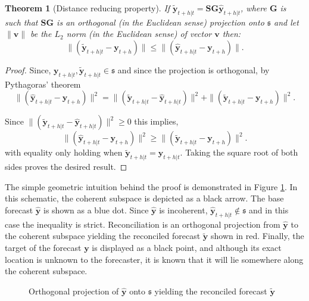 \documentclass[12pt]{article}
\newtheorem{theo}{Theorem}[section]
\theoremstyle{definition}
\theoremstyle{property}
\begin{document}
	
	\begin{theo}[Distance reducing property]\label{th:distred}
		If $\tilde{\bm{y}}_{t+h|t}=\bm{S}\bm{G}\hat{\bm{y}}_{t+h|t}$, where $\bm{G}$ is such that $\bm{S}\bm{G}$ is an orthogonal (in the Euclidean sense) projection onto $\mathfrak{s}$ and let $\|\bm{v}\|$ be the $L_2$ norm (in the Euclidean sense) of vector $\bm{v}$ then:
		\begin{equation}
		\|(\tilde{\bm{y}}_{t+h|t}-\bm{y}_{t+h})\|\le\|(\hat{\bm{y}}_{t+h|t}-\bm{y}_{t+h})\|.
		\end{equation}
	\end{theo}
	\begin{proof}
		Since, $\bm{y}_{t+h|t},\tilde{\bm{y}}_{t+h|t}\in\mathfrak{s}$ and since the projection is orthogonal, by Pythagoras' theorem
		\begin{equation}
		\|(\hat{\bm{y}}_{t+h|t}-\bm{y}_{t+h})\|^2=\|(\tilde{\bm{y}}_{t+h|t}-\hat{\bm{y}}_{t+h|t})\|^2+\|(\tilde{\bm{y}}_{t+h|t}-\bm{y}_{t+h})\|^2.
		\end{equation}
		
		Since $\|(\tilde{\bm{y}}_{t+h|t}-\hat{\bm{y}}_{t+h|t})\|^2\ge 0$ this implies,
		\begin{equation}
		\|(\hat{\bm{y}}_{t+h|t}-\bm{y}_{t+h})\|^2\ge\|(\tilde{\bm{y}}_{t+h|t}-\bm{y}_{t+h})\|^2.
		\end{equation}
		with equality only holding when $\tilde{\bm{y}}_{t+h|t}=\hat{\bm{y}}_{t+h|t}$.  Taking the square root of both sides proves the desired result.
	\end{proof}
		
	The simple geometric intuition behind the proof is demonstrated in Figure \ref{fig:Schematic_OLSRecon}.  In this schematic, the coherent subspace is depicted as a black arrow.  The base forecast $\hat{\bm{y}}$ is shown as a blue dot.  Since $\hat{\bm{y}}$ is incoherent, $\hat{\bm{y}}_{t+h|t}\notin\mathfrak{s}$ and in this case the inequality is strict.  Reconciliation is an orthogonal projection from $\hat{\bm{y}}$ to the coherent subspace yielding the reconciled forecast $\tilde{\bm{y}}$ shown in red.  Finally, the target of the forecast $\bm{y}$ is displayed as a black point, and although its exact location is unknown to the forecaster, it is known that it will lie somewhere along the coherent subspace.
	
	\begin{figure}[H]
		\centering
		\vspace{-0.9cm}
		\tiny
		\resizebox{\linewidth}{!}{}
		\caption{Orthogonal projection of $\hat{\bm{y}}$ onto $\mathfrak{s}$ yielding the reconciled forecast $\tilde{\bm{y}}$}\label{fig:Schematic_OLSRecon}
		
	\end{figure}
	
\end{document}
